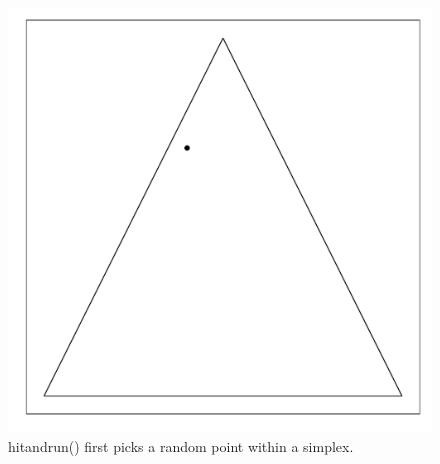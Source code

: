 \documentclass{article}\usepackage{graphicx, color}
\makeatletter
\def\maxwidth{ %
  \ifdim\Gin@nat@width>\linewidth
    \linewidth
  \else
    \Gin@nat@width
  \fi
}
\newenvironment{knitrout}{}{} %
\makeatother
\begin{document}
\begin{figure}[H]
\begin{knitrout}
\color{fgcolor}
\includegraphics[width=\maxwidth]{figure/hitandrun_walkthrough1} 

\end{knitrout}

\caption{hitandrun() first picks a random point within a simplex.}
\end{figure}
\end{document}
